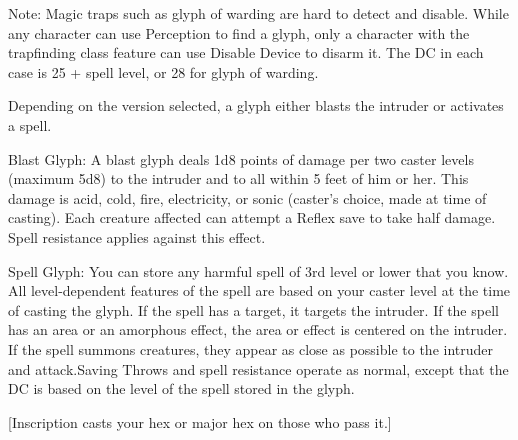 {Note: Magic traps such as glyph of warding are hard to detect and disable. While any character can use Perception to find a glyph, only a character with the trapfinding class feature can use Disable Device to disarm it. The DC in each case is 25 + spell level, or 28 for glyph of warding.

Depending on the version selected, a glyph either blasts the intruder or activates a spell.

Blast Glyph: A blast glyph deals 1d8 points of damage per two caster levels (maximum 5d8) to the intruder and to all within 5 feet of him or her. This damage is acid, cold, fire, electricity, or sonic (caster's choice, made at time of casting). Each creature affected can attempt a Reflex save to take half damage. Spell resistance applies against this effect.

Spell Glyph: You can store any harmful spell of 3rd level or lower that you know. All level-dependent features of the spell are based on your caster level at the time of casting the glyph. If the spell has a target, it targets the intruder. If the spell has an area or an amorphous effect, the area or effect is centered on the intruder. If the spell summons creatures, they appear as close as possible to the intruder and attack.Saving Throws and spell resistance operate as normal, except that the DC is based on the level of the spell stored in the glyph.}
        
[Inscription casts your hex or major hex on those who pass it.]
        
